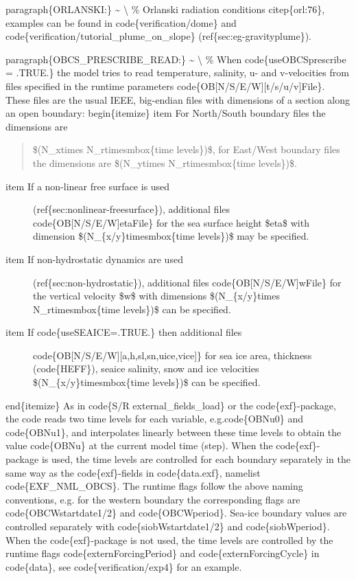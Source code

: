 \documentclass[letterpaper,10pt,english]{sphinxmanual}
\begin{document}
paragraph\{ORLANSKI:\} \textasciitilde{} \textbackslash{}
\%
Orlanski radiation conditions citep\{orl:76\}, examples can be found in
code\{verification/dome\} and
code\{verification/tutorial\_plume\_on\_slope\}
(ref\{sec:eg-gravityplume\}).

paragraph\{OBCS\_PRESCRIBE\_READ:\} \textasciitilde{} \textbackslash{}
\%
When code\{useOBCSprescribe = .TRUE.\} the model tries to read
temperature, salinity, u- and v-velocities from files specified in the
runtime parameters code\{OB{[}N/S/E/W{]}{[}t/s/u/v{]}File\}. These files are
the usual IEEE, big-endian files with dimensions of a section along an
open boundary:
begin\{itemize\}
item For North/South boundary files the dimensions are
\begin{quote}

\$(N\_xtimes N\_rtimesmbox\{time levels\})\$, for East/West boundary
files the dimensions are \$(N\_ytimes N\_rtimesmbox\{time levels\})\$.
\end{quote}
\begin{description}
\item[{item If a non-linear free surface is used}] \leavevmode
(ref\{sec:nonlinear-freesurface\}), additional files
code\{OB{[}N/S/E/W{]}etaFile\} for the sea surface height \$eta\$ with
dimension \$(N\_\{x/y\}timesmbox\{time levels\})\$ may be specified.

\item[{item If non-hydrostatic dynamics are used}] \leavevmode
(ref\{sec:non-hydrostatic\}), additional files
code\{OB{[}N/S/E/W{]}wFile\} for the vertical velocity \$w\$ with
dimensions \$(N\_\{x/y\}times N\_rtimesmbox\{time levels\})\$ can be
specified.

\item[{item If code\{useSEAICE=.TRUE.\} then additional files}] \leavevmode
code\{OB{[}N/S/E/W{]}{[}a,h,sl,sn,uice,vice{]}\} for sea ice area, thickness
(code\{HEFF\}), seaice salinity, snow and ice velocities
\$(N\_\{x/y\}timesmbox\{time levels\})\$ can be specified.

\end{description}

end\{itemize\}
As in code\{S/R external\_fields\_load\} or the code\{exf\}-package, the
code reads two time levels for each variable, e.g.code\{OBNu0\} and
code\{OBNu1\}, and interpolates linearly between these time levels to
obtain the value code\{OBNu\} at the current model time (step). When the
code\{exf\}-package is used, the time levels are controlled for each
boundary separately in the same way as the code\{exf\}-fields in
code\{data.exf\}, namelist code\{EXF\_NML\_OBCS\}. The runtime flags
follow the above naming conventions, e.g. for the western boundary the
corresponding flags are code\{OBCWstartdate1/2\} and
code\{OBCWperiod\}. Sea-ice boundary values are controlled separately
with code\{siobWstartdate1/2\} and code\{siobWperiod\}.  When the
code\{exf\}-package is not used, the time levels are controlled by the
runtime flags code\{externForcingPeriod\} and code\{externForcingCycle\}
in code\{data\}, see code\{verification/exp4\} for an example.
\end{document}
